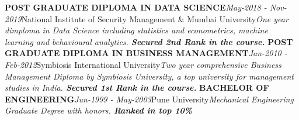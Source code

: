 \documentclass[11pt, a4paper]{awesome-cv}
\begin{document}
\textbf{POST GRADUATE DIPLOMA IN DATA SCIENCE}\hfill   \textit{May-2018 \hspace{2mm}- \hspace{2mm}Nov-2019}\newline National
Institute of Security Management \& Mumbai
University\newline \textit{One year dimploma in Data Science including statistics and econometrics, machine learning and behavioural analytics. \textbf{Secured 2nd Rank in the course.}}\newline \newline
\textbf{POST GRADUATE DIPLOMA IN BUSINESS MANAGEMENT}\hfill   \textit{Jan-2010 \hspace{2mm}- \hspace{2mm}Feb-2012}\newline Symbiosis
International
University\newline \textit{Two year comprehensive Business Management Diploma by Symbiosis University, a top university for management studies in India. \textbf{Secured 1st Rank in the course.}}\newline \newline
\textbf{BACHELOR OF ENGINEERING}\hfill   \textit{Jun-1999 \hspace{2mm}- \hspace{2mm}May-2003}\newline Pune
University\newline \textit{Mechanical Engineering Graduate Degree with honors. \textbf{Ranked in top 10\%}}\newline \newline
\end{document}
